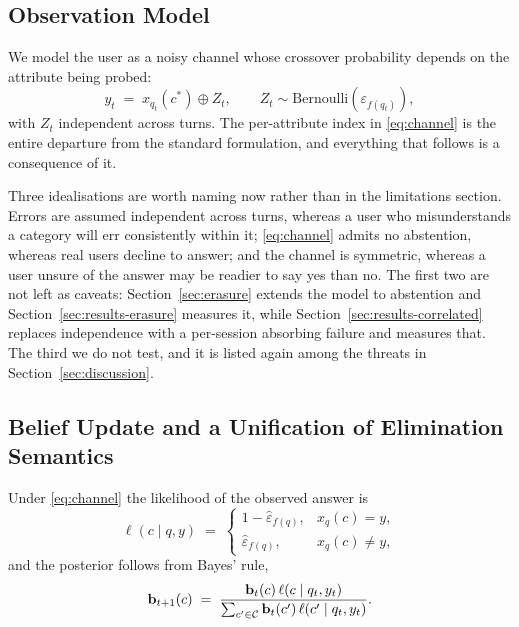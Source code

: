 \subsection{Observation Model}

We model the user as a noisy channel whose crossover probability depends on the
attribute being probed:
\begin{equation}
y_t \;=\; x_{q_t}(c^\ast) \oplus Z_t, \qquad
Z_t \sim \mathrm{Bernoulli}\!\left(\varepsilon_{f(q_t)}\right),
\label{eq:channel}
\end{equation}
with $Z_t$ independent across turns. The per-attribute index in
\eqref{eq:channel} is the entire departure from the standard formulation, and
everything that follows is a consequence of it.

Three idealisations are worth naming now rather than in the limitations
section. Errors are assumed independent across turns, whereas a user who
misunderstands a category will err consistently within it;
\eqref{eq:channel} admits no abstention, whereas real users decline to answer;
and the channel is symmetric, whereas a user unsure of the answer may be
readier to say yes than no. The first two are not left as caveats:
Section~\ref{sec:erasure} extends the model to abstention and
Section~\ref{sec:results-erasure} measures it, while
Section~\ref{sec:results-correlated} replaces independence with a per-session
absorbing failure and measures that. The third we do not test, and it is listed
again among the threats in Section~\ref{sec:discussion}.

\subsection{Belief Update and a Unification of Elimination Semantics}

Under \eqref{eq:channel} the likelihood of the observed answer is
\begin{equation}
\ell(c \mid q,y) \;=\;
\begin{cases}
1-\hat\varepsilon_{f(q)}, & x_q(c) = y,\\[2pt]
\hat\varepsilon_{f(q)}, & x_q(c) \neq y,
\end{cases}
\end{equation}
and the posterior follows from Bayes' rule,
\begin{equation}
\mathbf{b}_{t+1}(c) \;=\;
\frac{\mathbf{b}_t(c)\,\ell(c \mid q_t,y_t)}
     {\sum_{c'\in\mathcal{C}} \mathbf{b}_t(c')\,\ell(c' \mid q_t,y_t)}.
\label{eq:update}
\end{equation}

